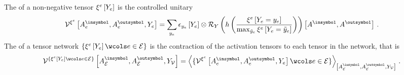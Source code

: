 

\begin{definition}
    The \activationCircuit{} of a non-negative tensor $\xi^{e}\left[Y_{e}\right]$ is the controlled unitary
    \begin{align*}
        \qcaencodingofat{\acttensorof{\edge}}{\cavariableof{\edge}{\insymbol},\cavariableof{\edge}{\outsymbol},\headvariableof{\edge}}
        = \sum_{\headindexof{\edge}} \onehotmapofat{\headindexof{\edge}}{\headvariableof{\edge}} \otimes
        \yrotationofat{h\left(\frac{\acttensorofat{\edge}{\indexedheadvariableof{\edge}}}{
            \max_{\secheadindexof{\edge}}\acttensorofat{\edge}{\headvariableof{\edge}=\secheadindexof{\edge}}
        }\right)}{\cavariable{\insymbol},\cavariable{\outsymbol}} \, .
    \end{align*}
    The \activationCircuit{} of a tensor network $\{\acttensorofat{\edge}{\headvariableof{\edge}}\wcols\edgein\}$ is the contraction of the activation tensors to each tensor in the network, that is
    \begin{align*}
        \qcaencodingofat{\{\acttensorofat{\edge}{\headvariableof{\edge}}\wcols\edgein\}}{\cavariableof{\edges}{\insymbol},\cavariableof{\edges}{\outsymbol},\headvariableof{\nodes}}
        = \contractionof{
            \{\qcaencodingofat{\acttensorof{\edge}}{\cavariableof{\edge}{\insymbol},\cavariableof{\edge}{\outsymbol},\headvariableof{\edge}}\wcols\edgein\}
        }{\cavariableof{\edges}{\insymbol},\cavariableof{\edges}{\outsymbol},\headvariableof{\nodes}} \, .
    \end{align*}
\end{definition}

